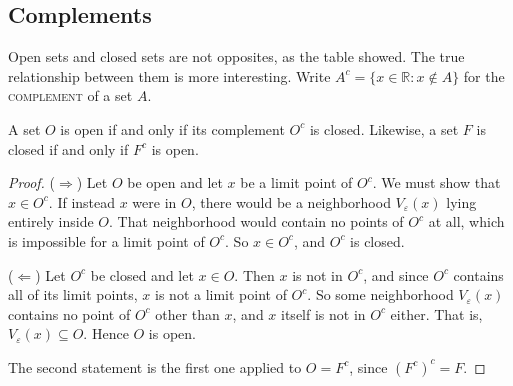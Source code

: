 \begin{marginfigure}
\centering
{}
\caption{A neighborhood inside a neighborhood.  The point $y$ is close to $x$, and $a \in A$ is close to $y$, so $a$ is close to $x$.}
\end{marginfigure}

\subsection{Complements}

Open sets and closed sets are not opposites, as the table showed.  The true relationship between them is more interesting.  Write $A^c = \{x \in \mathbb{R} : x \notin A\}$ for the \textsc{complement} of a set $A$.

\begin{theorem}\label{thm:complements}
A set $O$ is open if and only if its complement $O^c$ is closed.  Likewise, a set $F$ is closed if and only if $F^c$ is open.
\end{theorem}

\begin{proof}
($\Rightarrow$)  Let $O$ be open and let $x$ be a limit point of $O^c$.  We must show that $x \in O^c$.  If instead $x$ were in $O$, there would be a neighborhood $V_{\varepsilon}(x)$ lying entirely inside $O$.  That neighborhood would contain no points of $O^c$ at all, which is impossible for a limit point of $O^c$.  So $x \in O^c$, and $O^c$ is closed.

($\Leftarrow$)  Let $O^c$ be closed and let $x \in O$.  Then $x$ is not in $O^c$, and since $O^c$ contains all of its limit points, $x$ is not a limit point of $O^c$.  So some neighborhood $V_{\varepsilon}(x)$ contains no point of $O^c$ other than $x$, and $x$ itself is not in $O^c$ either.  That is, $V_{\varepsilon}(x) \subseteq O$.  Hence $O$ is open.

The second statement is the first one applied to $O = F^c$, since $(F^c)^c = F$.
\end{proof}

